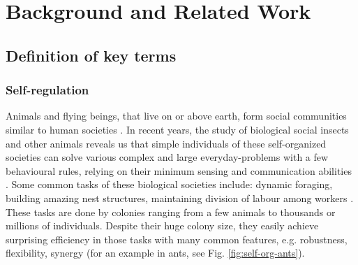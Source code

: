\chapter{Background and Related Work}
\label{bg}
\section{Definition of key terms}
\subsection{Self-regulation}
\label{bg:def:self-reg}
Animals and flying beings, that live on or above earth, form social communities similar to human societies \cite{SIHQ1995}. In recent years, the study of biological social insects and other animals reveals us that simple individuals of these self-organized  societies can solve various complex and large everyday-problems with a few behavioural rules, relying on their minimum sensing and communication abilities \cite{Camazine+2001}. Some common tasks of these biological societies include: dynamic foraging, building amazing nest structures, maintaining division of labour among workers \cite{Bonabeau+1999}. These tasks are done by colonies  ranging from a few animals to thousands or millions of individuals. Despite their huge colony size, they easily achieve surprising efficiency in those tasks with many common features, e.g. robustness, flexibility, synergy (for an example in ants, see Fig. \ref{fig:self-org-ants}).

